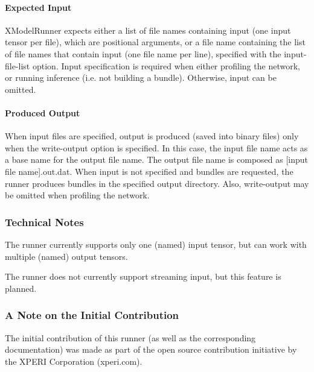 \paragraph*{Expected Input}

{\ttfamily X\+Model\+Runner} expects either a list of file names containing input (one input tensor per file), which are positional arguments, or a file name containing the list of file names that contain input (one file name per line), specified with the {\ttfamily input-\/file-\/list} option. Input specification is required when either profiling the network, or running inference (i.\+e. not building a bundle). Otherwise, input can be omitted.

\paragraph*{Produced Output}

When input files are specified, output is produced (saved into binary files) only when the {\ttfamily write-\/output} option is specified. In this case, the input file name acts as a base name for the output file name. The output file name is composed as {\ttfamily \mbox{[}input file name\mbox{]}.out.\+dat}. When input is not specified and bundles are requested, the runner produces bundles in the specified output directory. Also, {\ttfamily write-\/output} may be omitted when profiling the network.

\subsubsection*{Technical Notes}


\begin{DoxyEnumerate}
\item The runner currently supports only one (named) input tensor, but can work with multiple (named) output tensors.
\item The runner does not currently support streaming input, but this feature is planned.
\end{DoxyEnumerate}

\subsubsection*{A Note on the Initial Contribution}

The initial contribution of this runner (as well as the corresponding documentation) was made as part of the open source contribution initiative by the X\+P\+E\+RI Corporation (xperi.\+com). 